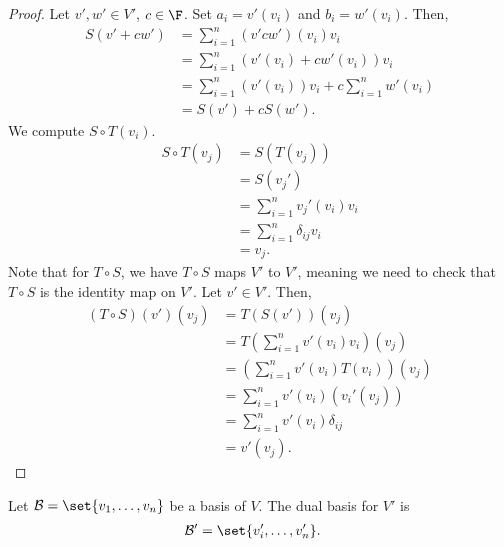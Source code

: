 \documentclass[10pt]{mypackage}
\begin{document}
\begin{proof}
  Let $v',w'\in V'$, $c\in \F$. Set $a_i = v'\left(v_i\right)$ and $b_i = w'\left(v_i\right)$. Then,
  \begin{align*}
    S\left(v' + cw'\right) &= \sum_{i=1}^{n}\left(v' cw'\right)\left(v_i\right)v_i\\
                           &= \sum_{i=1}^{n}\left(v'\left(v_i\right) + cw'\left(v_i\right)\right)v_i\\
                           &= \sum_{i=1}^{n}\left(v'\left(v_i\right)\right)v_i + c\sum_{i=1}^{n}w'\left(v_i\right)\\
                           &= S\left(v'\right) + cS\left(w'\right).
  \end{align*}
  We compute $S\circ T\left(v_i\right)$.
  \begin{align*}
    S\circ T\left(v_j\right) &= S\left(T\left(v_j\right)\right)\\
                             &= S\left(v_j'\right)\\
                             &= \sum_{i=1}^{n}v_j'\left(v_i\right)v_i\\
                             &= \sum_{i=1}^{n}\delta_{ij}v_i\\
                             &= v_j.
  \end{align*}
  Note that for $T\circ S$, we have $T\circ S$ maps $V'$ to $V'$, meaning we need to check that $T\circ S$ is the identity map on $V'$. Let $v'\in V'$. Then,
  \begin{align*}
    \left(T\circ S\right)\left(v'\right)\left(v_j\right) &= T\left(S\left(v'\right)\right)\left(v_j\right)\\
                                                         &= T\left(\sum_{i=1}^{n}v'\left(v_i\right)v_i\right)\left(v_j\right)\\
                                                         &= \left(\sum_{i=1}^{n}v'\left(v_i\right)T\left(v_i\right)\right)\left(v_j\right)\\
                                                         &= \sum_{i=1}^{n}v'\left(v_i\right)\left(v_i'\left(v_j\right)\right)\\
                                                         &= \sum_{i=1}^{n}v'\left(v_i\right)\delta_{ij}\\
                                                         &= v'\left(v_j\right).
  \end{align*}
\end{proof}
\begin{definition}
  Let $\mathcal{B} = \set{v_1,\dots,v_n}$ be a basis of $V$. The dual basis for $V'$ is
  \begin{align*}
    \mathcal{B}' &= \set{v_i',\dots,v_n'}.
  \end{align*}
\end{definition}
\end{document}
